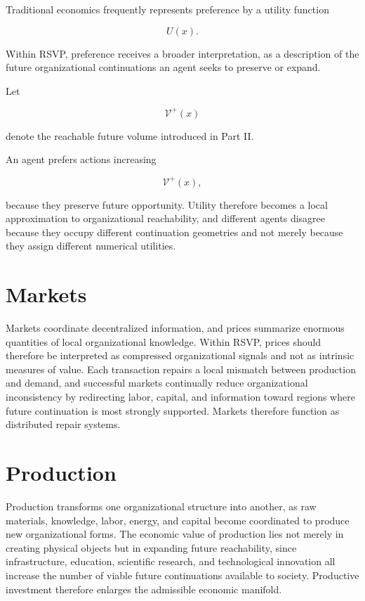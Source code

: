 \documentclass[11pt,oneside]{book}
\numberwithin{equation}{chapter}
\theoremstyle{definition}
\theoremstyle{plain}
\begin{document}
Traditional economics frequently represents preference by a utility
function

\[
U(x).
\]

Within RSVP, preference receives a broader interpretation, as a description of the future organizational continuations an agent seeks to preserve or expand.

Let

\[
\mathcal V^+(x)
\]

denote the reachable future volume introduced in Part II.

An agent prefers actions increasing

\[
\mathcal V^+(x),
\]

because they preserve future opportunity. Utility therefore becomes a local approximation to organizational reachability, and different agents disagree because they occupy different continuation geometries and not merely because they assign different numerical utilities.

\section{Markets}

Markets coordinate decentralized information, and prices summarize enormous quantities of local organizational knowledge. Within RSVP, prices should therefore be interpreted as compressed organizational signals and not as intrinsic measures of value. Each transaction repairs a local mismatch between production and demand, and successful markets continually reduce organizational inconsistency by redirecting labor, capital, and information toward regions where future continuation is most strongly supported. Markets therefore function as distributed repair systems.

\section{Production}

Production transforms one organizational structure into another, as raw materials, knowledge, labor, energy, and capital become coordinated to produce new organizational forms. The economic value of production lies not merely in creating physical objects but in expanding future reachability, since infrastructure, education, scientific research, and technological innovation all increase the number of viable future continuations available to society. Productive investment therefore enlarges the admissible economic manifold.
\end{document}
